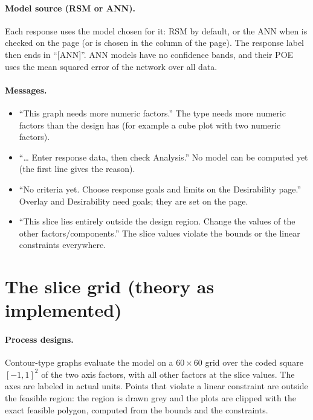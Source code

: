\paragraph{Model source (RSM or ANN).} Each response uses the model chosen for it: RSM by default, or the
ANN when  is checked on the
 page (or  is chosen in the  column of the  page). The response
label then ends in ``[ANN]''. ANN models have no confidence bands, and their POE uses the mean squared error
of the network over all data.

\paragraph{Messages.}
\begin{itemize}
  \item ``This graph needs more numeric factors.'' The type needs more numeric factors than the design has
        (for example a cube plot with two numeric factors).
  \item ``\dots{} Enter response data, then check Analysis.'' No model can be computed yet (the first line
        gives the reason).
  \item ``No criteria yet. Choose response goals and limits on the Desirability page.'' Overlay and
        Desirability need goals; they are set on the  page.
  \item ``This slice lies entirely outside the design region. Change the values of the other
        factors/components.'' The slice values violate the bounds or the linear constraints everywhere.
\end{itemize}

\section{The slice grid (theory as implemented)}\label{sec:ch06-grid}

\paragraph{Process designs.} Contour-type graphs evaluate the model on a $60\times60$ grid over the coded
square $[-1,1]^2$ of the two axis factors, with all other factors at the slice values. The axes are labeled
in actual units. Points that violate a linear constraint are outside the feasible region: the region is
drawn grey and the plots are clipped with the exact feasible polygon, computed from the bounds and the
constraints.

